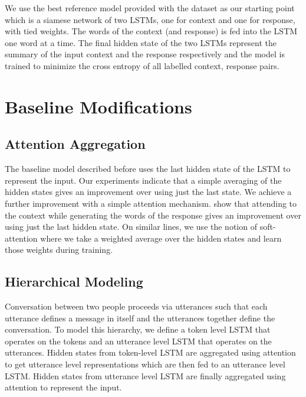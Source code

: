 \documentclass[11pt]{report}
\renewcommand\cite{\citep}	%
\begin{document}
We use the best reference model provided with the dataset as our starting point which is a siamese network of two LSTMs, one for context and one for response, with tied weights. The words of the context (and response) is fed into the LSTM one word at a time. The final hidden state of the two LSTMs represent the summary of the input context and the response respectively and the model is trained to minimize the cross entropy of all labelled context, response pairs.

\section{Baseline Modifications}\label{baseline_modifications}

\subsection{Attention Aggregation}\label{attention_aggregation}

The baseline model described before uses the last hidden state of the LSTM to represent the input. Our experiments indicate that a simple averaging of the hidden states gives an improvement over using just the last state. We achieve a further improvement with a simple attention mechanism. %
\cite{yao2016attentional} show that attending to the context while generating the words of the response gives an improvement over using just the last hidden state. On similar lines, we use the notion of soft-attention where we take a weighted average over the hidden states and learn those weights during training. 

\subsection{Hierarchical Modeling}\label{hierarchical_modeling}

Conversation between two people proceeds via utterances such that each utterance defines a message in itself and the utterances together define the conversation. To model this hierarchy, we define a token level LSTM that operates on the tokens and an utterance level LSTM that operates on the utterances. Hidden states from token-level LSTM are aggregated using attention to get utterance level representations which are then fed to an utterance level LSTM. Hidden states from utterance level LSTM are finally aggregated using attention to represent the input. %
\end{document}
